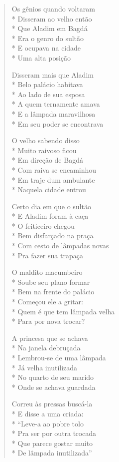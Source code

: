 \begin{verse}
Os gênios quando voltaram\\*
Disseram ao velho então\\*
Que Aladim em Bagdá\\*
Era o genro do sultão\\*
E ocupava na cidade\\*
Uma alta posição

Disseram mais que Aladim\\*
Belo palácio habitava\\*
Ao lado de sua esposa\\*
A quem ternamente amava\\*
E a lâmpada maravilhosa\\*
Em seu poder se encontrava

O velho sabendo disso\\*
Muito raivoso ficou\\*
Em direção de Bagdá\\*
Com raiva se encaminhou\\*
Em traje dum ambulante\\*
Naquela cidade entrou

Certo dia em que o sultão\\*
E Aladim foram à caça\\*
O feiticeiro chegou\\*
Bem disfarçado na praça\\*
Com cesto de lâmpadas novas\\*
Pra fazer sua trapaça

O maldito macumbeiro\\*
Soube seu plano formar\\*
Bem na frente do palácio\\*
Começou ele a gritar:\\*
Quem é que tem lâmpada velha\\*
Para por nova trocar?

A princesa que se achava\\*
Na janela debruçada\\*
Lembrou-se de uma lâmpada\\*
Já velha inutilizada\\*
No quarto de seu marido\\*
Onde se achava guardada

Correu às pressas buscá-la\\*
E disse a uma criada:\\*
``Leve-a ao pobre tolo\\*
Pra ser por outra trocada\\*
Que parece gostar muito\\*
De lâmpada inutilizada''


\end{verse}
